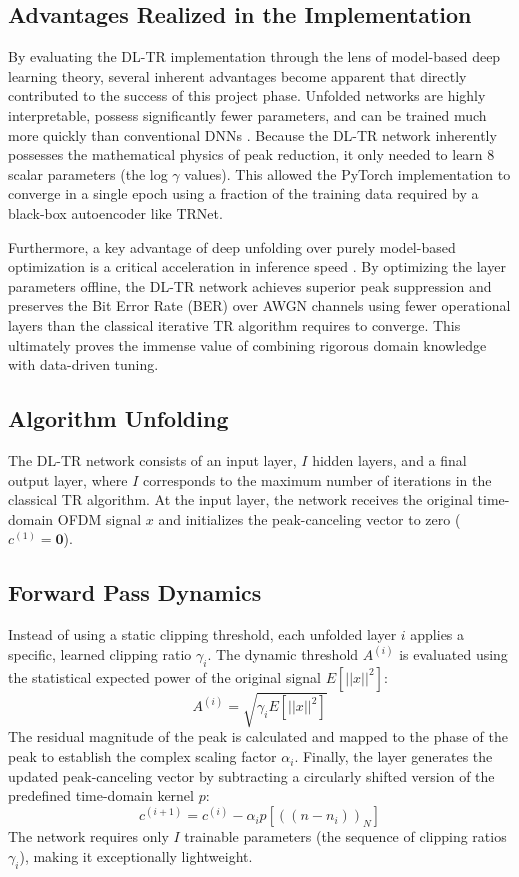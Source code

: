 \subsection{Advantages Realized in the Implementation}
By evaluating the DL-TR implementation through the lens of model-based deep learning theory, several inherent advantages become apparent that directly contributed to the success of this project phase. Unfolded networks are highly interpretable, possess significantly fewer parameters, and can be trained much more quickly than conventional DNNs \cite{dl_tr}. Because the DL-TR network inherently possesses the mathematical physics of peak reduction, it only needed to learn 8 scalar parameters (the log $\gamma$ values). This allowed the PyTorch implementation to converge in a single epoch using a fraction of the training data required by a black-box autoencoder like TRNet.

Furthermore, a key advantage of deep unfolding over purely model-based optimization is a critical acceleration in inference speed \cite{dl_tr}. By optimizing the layer parameters offline, the DL-TR network achieves superior peak suppression and preserves the Bit Error Rate (BER) over AWGN channels using fewer operational layers than the classical iterative TR algorithm requires to converge. This ultimately proves the immense value of combining rigorous domain knowledge with data-driven tuning.

\subsection{Algorithm Unfolding}
The DL-TR network consists of an input layer, $I$ hidden layers, and a final output layer, where $I$ corresponds to the maximum number of iterations in the classical TR algorithm. At the input layer, the network receives the original time-domain OFDM signal $x$ and initializes the peak-canceling vector to zero ($c^{(1)} = \mathbf{0}$).

\subsection{Forward Pass Dynamics}
Instead of using a static clipping threshold, each unfolded layer $i$ applies a specific, learned clipping ratio $\gamma_i$. The dynamic threshold $A^{(i)}$ is evaluated using the statistical expected power of the original signal $E[||x||^2]$:
\begin{equation*}
    A^{(i)} = \sqrt{\gamma_i E[||x||^2]}
\end{equation*}
The residual magnitude of the peak is calculated and mapped to the phase of the peak to establish the complex scaling factor $\alpha_i$. Finally, the layer generates the updated peak-canceling vector by subtracting a circularly shifted version of the predefined time-domain kernel $p$:
\begin{equation*}
    c^{(i+1)} = c^{(i)} - \alpha_i p[((n-n_i))_N]
\end{equation*}
The network requires only $I$ trainable parameters (the sequence of clipping ratios $\gamma_i$), making it exceptionally lightweight.

